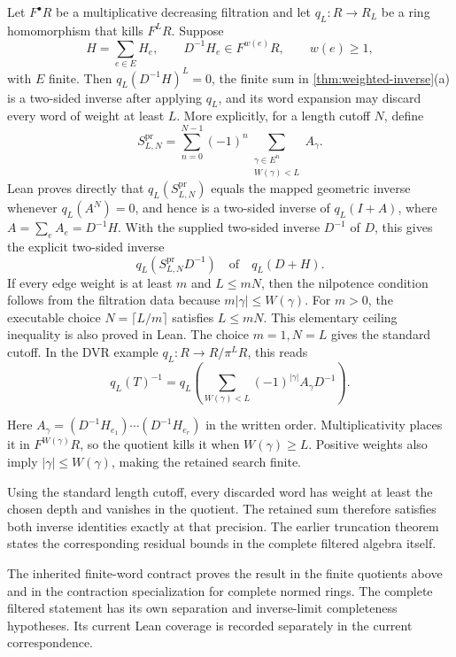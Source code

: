 \begin{corollary}\label{cor:finite-precision}
Let $F^\bullet R$ be a multiplicative decreasing filtration and let
$q_L:R\to R_L$ be a ring homomorphism that kills $F^L R$. Suppose
\[
H=\sum_{e\in E}H_e,
\qquad D^{-1}H_e\in F^{w(e)}R,
\qquad w(e)\ge1,
\]
with $E$ finite. Then $q_L(D^{-1}H)^L=0$, the finite sum in
\cref{thm:weighted-inverse}(a) is a two-sided inverse after applying $q_L$,
and its word expansion may discard every word of weight at least $L$.
More explicitly, for a length cutoff $N$, define
\[
S^{\mathrm{pr}}_{L,N}
=
\sum_{n=0}^{N-1}(-1)^n
\sum_{\substack{\gamma\in E^n\\W(\gamma)<L}}A_\gamma.
\]
Lean proves directly that $q_L(S^{\mathrm{pr}}_{L,N})$ equals the mapped
geometric inverse whenever $q_L(A^N)=0$, and hence is a two-sided inverse of
$q_L(I+A)$, where $A=\sum_eA_e=D^{-1}H$. With the supplied two-sided
inverse $D^{-1}$ of $D$, this gives the explicit two-sided inverse
\[
\boxed{q_L\!\left(S^{\mathrm{pr}}_{L,N}D^{-1}\right)}
\quad\text{of}\quad q_L(D+H).
\]
If every edge weight is at least $m$ and $L\le mN$, then the nilpotence
condition follows from the filtration data because
$m|\gamma|\le W(\gamma)$. For $m>0$, the executable choice
$N=\lceil L/m\rceil$ satisfies $L\le mN$. This elementary ceiling inequality
is also proved in Lean. The choice $m=1,N=L$ gives the standard cutoff.
In the DVR example $q_L:R\to R/\pi^L R$, this reads
\[
q_L(T)^{-1}
=
q_L\!\left(\sum_{W(\gamma)<L}
(-1)^{|\gamma|}A_\gamma D^{-1}\right).
\]
\end{corollary}

Here $A_\gamma=(D^{-1}H_{e_1})\cdots(D^{-1}H_{e_r})$ in the written
order. Multiplicativity places it in $F^{W(\gamma)}R$, so the quotient kills
it when $W(\gamma)\ge L$. Positive weights also imply
$|\gamma|\le W(\gamma)$, making the retained search finite.

\begin{interpretation}
Using the standard length cutoff, every discarded word has weight at least the chosen depth and vanishes in the quotient. The retained sum therefore satisfies both inverse identities exactly at that precision. The earlier truncation theorem states the corresponding residual bounds in the complete filtered algebra itself.
\end{interpretation}

The inherited finite-word contract proves the result in the finite quotients above and in the contraction specialization for complete normed rings. The complete filtered statement has its own separation and inverse-limit completeness hypotheses. Its current Lean coverage is recorded separately in the current correspondence.

